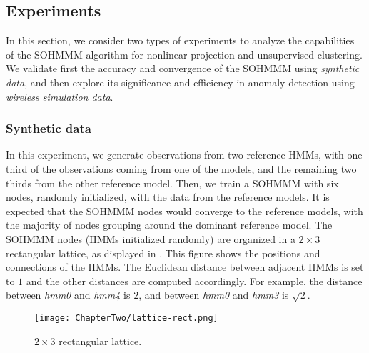 \subsection{Experiments}
\label{sec:sohmmm_experiments}
In this section, we consider two types of experiments to analyze the capabilities of the SOHMMM algorithm for nonlinear projection and unsupervised clustering. We validate first the accuracy and convergence of the SOHMMM using \textit{synthetic data}, and then explore its significance and efficiency in anomaly detection using \textit{wireless simulation data}.

\subsubsection{Synthetic data}
\label{sec:sohmmm_experiment_synth}

In this experiment, we generate observations from two reference HMMs, with one third of the observations coming from one of the models, and the remaining two thirds from the other reference model. Then, we train a SOHMMM with six nodes, randomly initialized, with the data from the reference models. It is expected that the SOHMMM nodes would converge to the reference models, with the majority of nodes grouping around the dominant reference model. The SOHMMM nodes (HMMs initialized randomly) are organized in a $2 \times 3$ rectangular lattice, as displayed in . This figure shows the positions and connections of the HMMs. The Euclidean distance between adjacent HMMs is set to $1$ and the other distances are computed accordingly. For example, the distance between \textit{hmm0} and \textit{hmm4} is $2$, and between \textit{hmm0} and \textit{hmm3} is $\sqrt{2}$.

\begin{figure}[h]
    \centering
    \texttt{[image: ChapterTwo/lattice-rect.png]}
    \caption{$2 \times 3$ rectangular lattice.}
    \label{fig:sohmmm_lattice}
\end{figure}

